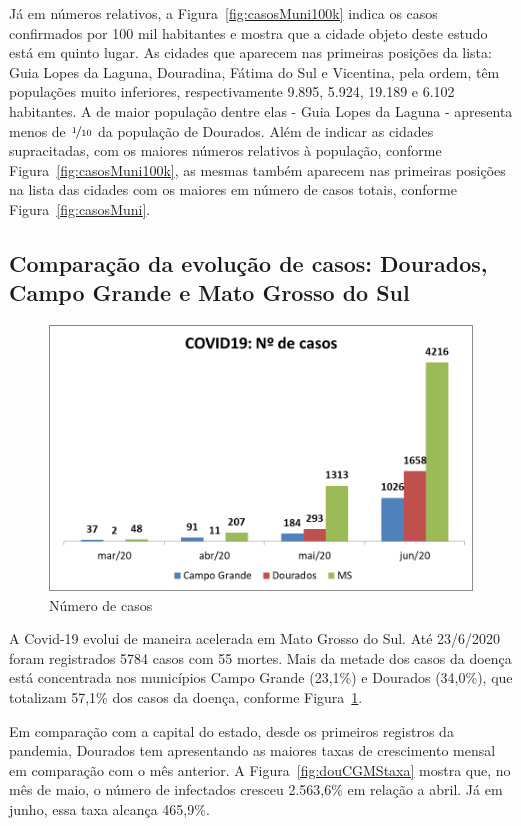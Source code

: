 \documentclass[12pt]{article}
\begin{document}
Já em números relativos, a Figura~\ref{fig:casosMuni100k} indica os casos confirmados por 100 mil habitantes e mostra que a cidade objeto deste estudo está em quinto lugar. As cidades que aparecem nas primeiras posições da lista: Guia Lopes da Laguna, Douradina, Fátima do Sul e Vicentina, pela ordem, têm populações muito inferiores, respectivamente 9.895, 5.924, 19.189 e 6.102 habitantes. A de maior população dentre elas - Guia Lopes da Laguna - apresenta menos de \(\nicefrac{1}{10}\) da população de Dourados. Além de indicar as cidades supracitadas, com os maiores números relativos à população, conforme Figura~\ref{fig:casosMuni100k}, as mesmas também aparecem nas primeiras posições na lista das cidades com os maiores em número de casos totais, conforme Figura~\ref{fig:casosMuni}.

\subsection{Comparação da evolução de casos: Dourados, Campo Grande e Mato Grosso do Sul}\label{ssec:DouCGMS}

\begin{figure}[!htb]
  \centering
  \includegraphics[width=.5\textwidth]{figs/douCGMS01.png}
  \caption{Número de casos}
  \label{fig:douCGMScasos}
  \end{figure}


A Covid-19 evolui de maneira acelerada em Mato Grosso do Sul. Até 23/6/2020 foram registrados 5784 casos com 55 mortes. Mais da metade dos casos da doença está concentrada nos municípios Campo Grande (23,1\%) e Dourados (34,0\%), que totalizam 57,1\% dos casos da doença, conforme Figura~\ref{fig:douCGMScasos}.


Em comparação com a capital do estado, desde os primeiros registros da pandemia, Dourados tem apresentando as maiores taxas de crescimento mensal em comparação com o mês anterior. A Figura~\ref{fig:douCGMStaxa} mostra que, no mês de maio, o número de infectados cresceu 2.563,6\% em relação a abril. Já  em  junho, essa taxa alcança 465,9\%.
\end{document}
